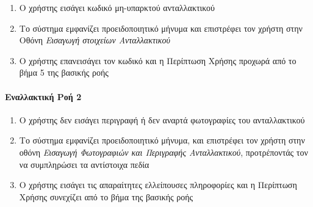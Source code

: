 \documentclass{../ol-softwaremanual}
\begin{document}
	\begin{enumerate}
		\item Ο χρήστης εισάγει κωδικό μη-υπαρκτού ανταλλακτικού
		\item Το σύστημα εμφανίζει προειδοποιητικό μήνυμα και επιστρέφει τον χρήστη στην Οθόνη \textit{Εισαγωγή στοιχείων Ανταλλακτικού}
		\item Ο χρήστης επανεισάγει τον κωδικό και η Περίπτωση Χρήσης προχωρά από το βήμα 5 της βασικής ροής
	\end{enumerate}
	
	\paragraph{Εναλλακτική Ροή 2}
	
	\begin{enumerate}
		\item Ο χρήστης δεν εισάγει περιγραφή ή δεν αναρτά φωτογραφίες του ανταλλακτικού
		\item Το σύστημα εμφανίζει προειδοποιητικό μήνυμα, και επιστρέφει τον χρήστη στην οθόνη \textit{Εισαγωγή Φωτογραφιών και Περιγραφής Ανταλλακτικού}, προτρέποντάς τον να συμπληρώσει τα αντίστοιχα πεδία
		\item Ο χρήστης εισάγει τις απαραίτητες ελλείπουσες πληροφορίες και η Περίπτωση Χρήσης συνεχίζει από το βήμα  της βασικής ροής
	\end{enumerate}
	
	
\end{document}
